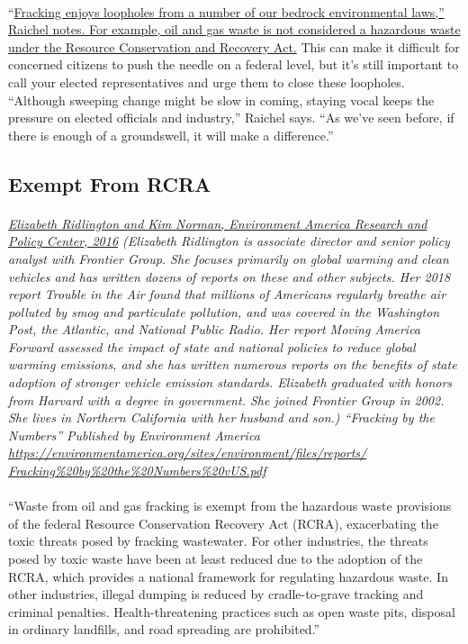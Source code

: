 \documentclass{article}
\begin{document}
\paragraph{}
``\ul{Fracking enjoys loopholes from a number of our bedrock environmental laws,'' Raichel notes. For example, oil and gas waste is not considered a hazardous waste under the Resource Conservation and Recovery Act.} This can make it difficult for concerned citizens to push the needle on a federal level, but it’s still important to call your elected representatives and urge them to close these loopholes. ``Although sweeping change might be slow in coming, staying vocal keeps the pressure on elected officials and industry,” Raichel says. ``As we’ve seen before, if there is enough of a groundswell, it will make a difference.”

\subsection{Exempt From RCRA}
\paragraph{}
\small
\textit{
\underline{Elizabeth Ridlington and Kim Norman, Environment America Research and Policy Center, 2016}
(Elizabeth Ridlington is associate director and senior policy analyst with Frontier Group. She focuses primarily on global warming and clean vehicles and has written dozens of reports on these and other subjects. Her 2018 report Trouble in the Air found that millions of Americans regularly breathe air polluted by smog and particulate pollution, and was covered in the Washington Post, the Atlantic, and National Public Radio. Her report Moving America Forward assessed the impact of state and national policies to reduce global warming emissions, and she has written numerous reports on the benefits of state adoption of stronger vehicle emission standards. Elizabeth graduated with honors from Harvard with a degree in government. She joined Frontier Group in 2002. She lives in Northern California with her husband and son.) “Fracking by the Numbers” Published by Environment America 
\url{https://environmentamerica.org/sites/environment/files/reports/ Fracking\%20by\%20the\%20Numbers\%20vUS.pdf}}
\normalsize
\paragraph{}
``Waste from oil and gas fracking is exempt from the hazardous waste provisions of the federal Resource Conservation Recovery Act (RCRA), exacerbating the toxic threats posed by fracking wastewater. For other industries, the threats posed by toxic waste have been at least reduced due to the adoption of the RCRA, which provides a national framework for regulating hazardous waste. In other industries, illegal dumping is reduced by cradle-to-grave tracking and criminal penalties. Health-threatening practices such as open waste pits, disposal in ordinary landfills, and road spreading are prohibited.”
\end{document}
